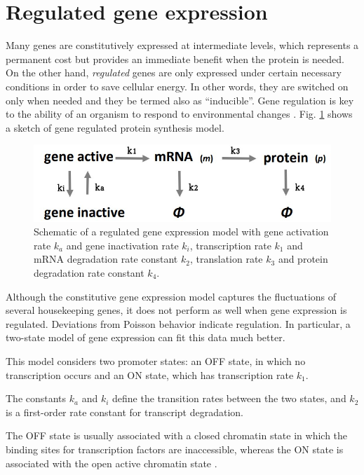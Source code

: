\documentclass[12pt,a4paper]{report}
\begin{document}
\section{Regulated gene expression}\label{regulatedgeneexpressionsection}
Many genes are constitutively expressed at intermediate levels, which represents a permanent cost but provides an immediate benefit when the protein is needed. On the other hand, \emph{regulated} genes are only expressed under certain necessary conditions in order to save cellular energy. In other words, they are switched on only when needed and they be termed also as ``inducible''. Gene regulation is key to the ability of an organism to respond to environmental changes \cite{generegulationNIH}. Fig. \ref{regulatedgeneexpression} shows a sketch of gene regulated protein synthesis model.

\begin{figure}[!ht]
\centering
\includegraphics[scale=0.40]{simplest_protein_synthesis_model.jpg}
\caption{Schematic of a regulated gene expression model with gene activation rate $k_{a}$ and gene inactivation rate $k_{i}$, transcription rate $k_{1}$ and mRNA degradation rate constant $k_{2}$, translation rate $k_{3}$ and protein degradation rate constant $k_{4}$.}
\label{regulatedgeneexpression}
\end{figure}

Although the constitutive gene expression model captures the fluctuations of several housekeeping genes, it does not perform as well when gene expression is regulated. Deviations from Poisson behavior indicate regulation. In particular, a two-state model of gene expression can fit this data much better.

This model considers two promoter states: an OFF state, in which no transcription occurs and an ON state, which has transcription rate $k_{1}$. 

The constants $k_{a}$ and $k_{i}$ define the transition rates between the two states, and $k_{2}$ is a first-order rate constant for transcript degradation.

The OFF state is usually associated with a closed chromatin state in which the binding sites for transcription factors are inaccessible, whereas the ON state is associated with the open active chromatin state \cite{geneexpressionnoise}.
\end{document}
